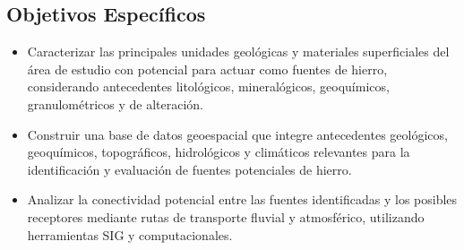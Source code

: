 \subsection{Objetivos Específicos}
\begin{itemize}
    \item Caracterizar las principales unidades geológicas y materiales superficiales del área de estudio con potencial para actuar como fuentes de hierro, considerando antecedentes litológicos, mineralógicos, geoquímicos, granulométricos y de alteración.
    \item Construir una base de datos geoespacial que integre antecedentes geológicos, geoquímicos, topográficos, hidrológicos y climáticos relevantes para la identificación y evaluación de fuentes potenciales de hierro.
    \item Analizar la conectividad potencial entre las fuentes identificadas y los posibles receptores mediante rutas de transporte fluvial y atmosférico, utilizando herramientas SIG y computacionales.
\end{itemize}